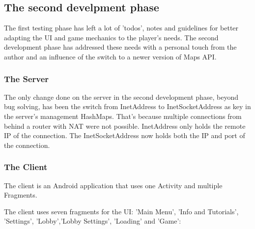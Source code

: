 \documentclass{article}
\begin{document}
\subsection{The second develpment phase}

The first testing phase has left a lot of 'todos', notes and guidelines for
better adapting the UI and game mechanics to the player's needs. The second
development phase has addressed these needs with a personal touch from the
author and an influence of the switch to a newer version of Maps API.

\subsubsection{The Server}

The only change done on the server in the second development phase, beyond bug
solving, has been the switch from InetAddress to InetSocketAddress as key in the
server's management HashMaps. That's because multiple connections from behind a
router with NAT were not possible. InetAddress only holds the remote IP of the
connection. The InetSocketAddress now holds both the IP and port of the
connection.

\subsubsection{The Client}

The client is an Android application that uses one Activity and multiple
Fragments. 

The client uses seven fragments for the UI: 'Main Menu', 'Info and
Tutorials', 'Settings', 'Lobby','Lobby Settings', 'Loading' and 'Game':
\end{document}
